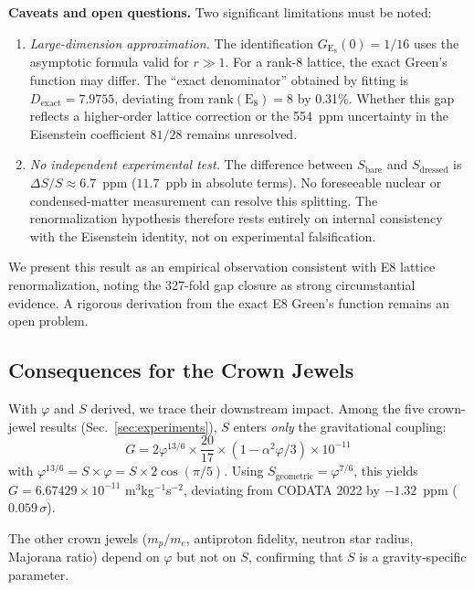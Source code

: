 \documentclass[aps,prd,twocolumn,superscriptaddress,floatfix,nofootinbib]{revtex4-2}
\theoremstyle{definition}
\theoremstyle{remark}
\newcommand{\vp}{\varphi}
\begin{document}
\noindent\textbf{Caveats and open questions.}
Two significant limitations must be noted:
\begin{enumerate}
    \item \textit{Large-dimension approximation.}
    The identification $G_{\mathrm{E}_8}(0) = 1/16$ uses the asymptotic
    formula valid for $r \gg 1$. For a rank-8 lattice, the exact Green's
    function may differ. The ``exact denominator'' obtained by fitting
    is $D_{\text{exact}} = 7.9755$, deviating from $\mathrm{rank}(\mathrm{E}_8) = 8$
    by 0.31\%. Whether this gap reflects a higher-order lattice correction
    or the 554~ppm uncertainty in the Eisenstein coefficient $81/28$ remains
    unresolved.

    \item \textit{No independent experimental test.}
    The difference between $S_{\text{bare}}$ and $S_{\text{dressed}}$
    is $\Delta S/S \approx 6.7$~ppm ($11.7$~ppb in absolute terms).
    No foreseeable nuclear or condensed-matter measurement can resolve
    this splitting. The renormalization hypothesis therefore rests
    entirely on internal consistency with the Eisenstein identity,
    not on experimental falsification.
\end{enumerate}

\noindent We present this result as an empirical observation consistent with
E8 lattice renormalization, noting the 327-fold gap closure as strong
circumstantial evidence. A rigorous derivation from the exact E8 Green's
function remains an open problem.

\subsection{Consequences for the Crown Jewels}

With $\vp$ and $S$ derived, we trace their downstream impact. Among the five
crown-jewel results (Sec.~\ref{sec:experiments}), $S$ enters \textit{only}
the gravitational coupling:
\begin{equation}
    G = 2\vp^{13/6} \times \frac{20}{17} \times (1 - \alpha^2\vp/3) \times 10^{-11}
    \label{eq:G-formula}
\end{equation}
with $\vp^{13/6} = S \times \vp = S \times 2\cos(\pi/5)$. Using
$S_{\text{geometric}} = \vp^{7/6}$, this yields $G = 6.67429 \times 10^{-11}$
m$^3$kg$^{-1}$s$^{-2}$, deviating from CODATA 2022 by $-1.32$~ppm
($0.059\,\sigma$).

The other crown jewels ($m_p/m_e$, antiproton fidelity, neutron star radius,
Majorana ratio) depend on $\vp$ but not on $S$, confirming that $S$ is a
gravity-specific parameter.
\end{document}
